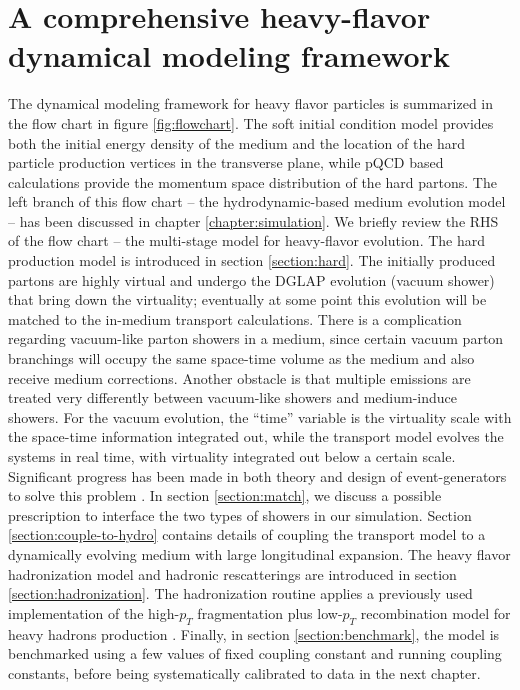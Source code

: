 \chapter{A comprehensive heavy-flavor dynamical modeling framework}
\label{chapter:coupling}
The dynamical modeling framework for heavy flavor particles is summarized in the flow chart in figure \ref{fig:flowchart}.
The soft initial condition model provides both the initial energy density of the medium and the location of the hard particle production vertices in the transverse plane, while pQCD based calculations provide the momentum space distribution of the hard partons.
The left branch of this flow chart -- the hydrodynamic-based medium evolution model -- has been discussed in chapter \ref{chapter:simulation}.
We briefly review the RHS of the flow chart -- the multi-stage model for heavy-flavor evolution.
The hard production model is introduced in section \ref{section:hard}.
The initially produced partons are highly virtual and undergo the DGLAP evolution (vacuum shower) that bring down the virtuality; eventually at some point this evolution will be matched to the in-medium transport calculations.
There is a complication regarding vacuum-like parton showers in a medium, since certain vacuum parton branchings will occupy the same space-time volume as the medium and also receive medium corrections.
Another obstacle is that multiple emissions are treated very differently between vacuum-like showers and medium-induce showers.
For the vacuum evolution, the ``time'' variable is the virtuality scale with the space-time information integrated out, while the transport model evolves the systems in real time, with virtuality integrated out below a certain scale.
Significant progress has been made in both theory and design of event-generators to solve this problem \cite{MehtarTani:2012cy,Mehtar-Tani:2017ypq,Cao:2017zih,Kauder:2018cdt,Putschke:2019yrg,PhysRevLett.120.232001,Caucal:2018ofz}.
In section \ref{section:match}, we discuss a possible prescription to interface the two types of showers in our simulation.
Section \ref{section:couple-to-hydro} contains details of coupling the transport model to a dynamically evolving medium with large longitudinal expansion.
The heavy flavor hadronization model and hadronic rescatterings are introduced in section \ref{section:hadronization}.
The hadronization routine applies a previously used implementation \cite{Cao:2013ita} of the high-$p_T$ fragmentation plus low-$p_T$ recombination model for heavy hadrons production \cite{Oh:2009zj}.
Finally, in section \ref{section:benchmark}, the model is benchmarked using a few values of fixed coupling constant and running coupling constants, before being systematically calibrated to data in the next chapter.
